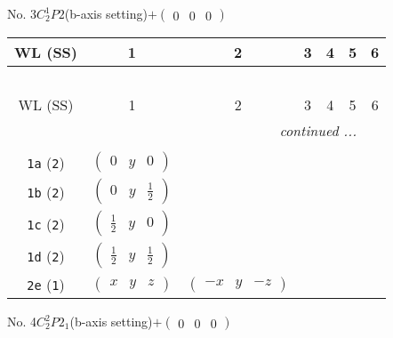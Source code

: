 \documentclass[fleqn,9pt,landscape]{jsarticle}
\begin{document}
\newpage
No. 3\quad$C_{2}^{1}$\quad$P2$\quad(b-axis setting)\quad[ monoclinic ]\quad$+\begin{pmatrix} 0 & 0 & 0 \end{pmatrix}$
\begin{center}
\renewcommand{\arraystretch}{1.2}
\begin{longtable}{ccccccc}
 \hline \hline
WL (SS) & 1 & 2 & 3 & 4 & 5 & 6 \\ \hline \endfirsthead

\multicolumn{6}{l}{\tablename\ \thetable{}} \\
 \hline \hline
WL (SS) & 1 & 2 & 3 & 4 & 5 & 6 \\ \hline \endhead

 \hline \hline
\multicolumn{6}{r}{\footnotesize\it continued ...} \\ \endfoot

 \hline \hline
\multicolumn{6}{r}{} \\ \endlastfoot

{\tt 1a} ({\tt 2}) & $ \begin{pmatrix} 0 & y & 0 \end{pmatrix} $ & $  $ \\ \hline
{\tt 1b} ({\tt 2}) & $ \begin{pmatrix} 0 & y & \frac{1}{2} \end{pmatrix} $ & $  $ \\ \hline
{\tt 1c} ({\tt 2}) & $ \begin{pmatrix} \frac{1}{2} & y & 0 \end{pmatrix} $ & $  $ \\ \hline
{\tt 1d} ({\tt 2}) & $ \begin{pmatrix} \frac{1}{2} & y & \frac{1}{2} \end{pmatrix} $ & $  $ \\ \hline
{\tt 2e} ({\tt 1}) & $ \begin{pmatrix} x & y & z \end{pmatrix} $ & $ \begin{pmatrix} - x & y & - z \end{pmatrix} $ \\
\end{longtable}
\end{center}
\newpage
No. 4\quad$C_{2}^{2}$\quad$P2_1$\quad(b-axis setting)\quad[ monoclinic ]\quad$+\begin{pmatrix} 0 & 0 & 0 \end{pmatrix}$
\end{document}
